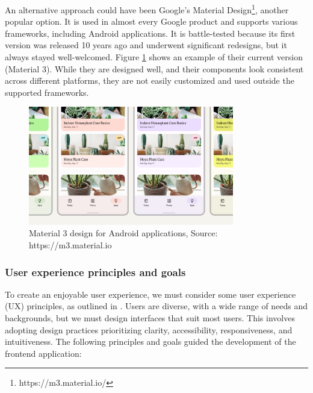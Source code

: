 An alternative approach could have been Google's Material Design\footnote{https://m3.material.io/}, another popular option. It is used in almost every Google product and supports various frameworks, including Android applications. It is battle-tested because its first version was released 10 years ago and underwent significant redesigns, but it always stayed well-welcomed. Figure \ref{fig:material3} shows an example of their current version (Material 3). While they are designed well, and their components look consistent across different platforms, they are not easily customized and used outside the supported frameworks.

\begin{figure}[H]
    \centering
    \includegraphics[width=0.8\textwidth, keepaspectratio]{figures/material3.png}
    \caption{Material 3 design for Android applications, Source: https://m3.material.io}
    \label{fig:material3}
\end{figure}

\subsubsection{User experience principles and goals}

To create an enjoyable user experience, we must consider some user experience (UX) principles, as outlined in \cite{cooper2014face}. Users are diverse, with a wide range of needs and backgrounds, but we must design interfaces that suit most users. This involves adopting design practices prioritizing clarity, accessibility, responsiveness, and intuitiveness. The following principles and goals guided the development of the frontend application:

